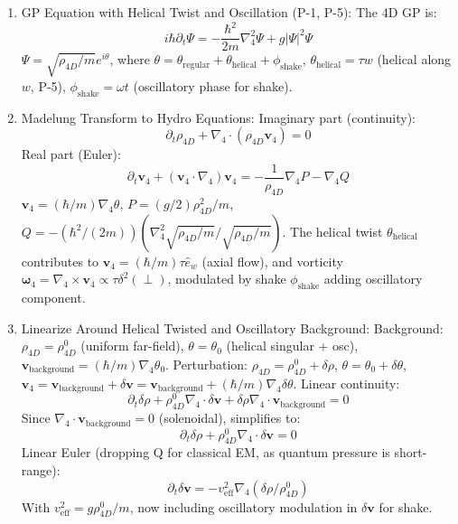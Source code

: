 \begin{enumerate}
\item GP Equation with Helical Twist and Oscillation (P-1, P-5): The 4D GP is:
\[ i \hbar \partial_t \Psi = - \frac{\hbar^2}{2m} \nabla_4^2 \Psi + g |\Psi|^2 \Psi \]
$\Psi = \sqrt{\rho_{4D} / m} e^{i \theta}$, where $\theta = \theta_{\text{regular}} + \theta_{\text{helical}} + \phi_{\text{shake}}$, $\theta_{\text{helical}} = \tau w$ (helical along $w$, P-5), $\phi_{\text{shake}} = \omega t$ (oscillatory phase for shake).
\item Madelung Transform to Hydro Equations: Imaginary part (continuity):
\[ \partial_t \rho_{4D} + \nabla_4 \cdot (\rho_{4D} \mathbf{v}_4) = 0 \]
Real part (Euler):
\[ \partial_t \mathbf{v}_4 + (\mathbf{v}_4 \cdot \nabla_4) \mathbf{v}_4 = - \frac{1}{\rho_{4D}} \nabla_4 P - \nabla_4 Q \]
$\mathbf{v}_4 = (\hbar / m) \nabla_4 \theta$, $P = (g / 2) \rho_{4D}^2 / m$, $Q = - (\hbar^2 / (2m)) (\nabla_4^2 \sqrt{\rho_{4D} / m} / \sqrt{\rho_{4D} / m})$. The helical twist $\theta_{\text{helical}}$ contributes to $\mathbf{v}_4 = (\hbar / m) \tau \hat{e}_w$ (axial flow), and vorticity $\boldsymbol{\omega}_4 = \nabla_4 \times \mathbf{v}_4 \propto \tau \delta^2(\perp)$, modulated by shake $\phi_{\text{shake}}$ adding oscillatory component.
\item Linearize Around Helical Twisted and Oscillatory Background: Background: $\rho_{4D} = \rho_{4D}^0$ (uniform far-field), $\theta = \theta_0$ (helical singular + osc), $\mathbf{v}_{\text{background}} = (\hbar / m) \nabla_4 \theta_0$. Perturbation: $\rho_{4D} = \rho_{4D}^0 + \delta\rho$, $\theta = \theta_0 + \delta\theta$, $\mathbf{v}_4 = \mathbf{v}_{\text{background}} + \delta\mathbf{v} = \mathbf{v}_{\text{background}} + (\hbar / m) \nabla_4 \delta\theta$. Linear continuity:
\[ \partial_t \delta \rho + \rho_{4D}^0 \nabla_4 \cdot \delta \mathbf{v} + \delta \rho \nabla_4 \cdot \mathbf{v}_{\text{background}} = 0 \]
Since $\nabla_4 \cdot \mathbf{v}_{\text{background}} = 0$ (solenoidal), simplifies to:
\[ \partial_t \delta \rho + \rho_{4D}^0 \nabla_4 \cdot \delta \mathbf{v} = 0 \]
Linear Euler (dropping Q for classical EM, as quantum pressure is short-range):
\[ \partial_t \delta \mathbf{v} = - v_{\text{eff}}^2 \nabla_4 (\delta \rho / \rho_{4D}^0) \]
With $v_{\text{eff}}^2 = g \rho_{4D}^0 / m$, now including oscillatory modulation in $\delta \mathbf{v}$ for shake.

\end{enumerate}
